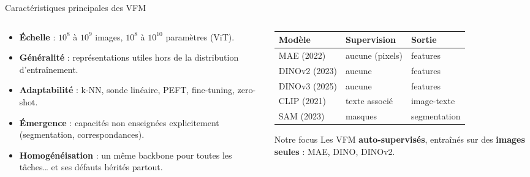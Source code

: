 \documentclass[aspectratio=169,10pt]{beamer}
\begin{document}
\begin{frame}{Caractéristiques principales des VFM}
  \begin{columns}[T]
    \begin{column}{0.5\textwidth}
      \begin{itemize}
        \setlength{\itemsep}{1.5mm}
        \item \textbf{Échelle} : $10^8$ à $10^9$ images, $10^8$ à $10^{10}$ paramètres (ViT).
        \item \textbf{Généralité} : représentations utiles hors de la distribution d'entraînement.
        \item \textbf{Adaptabilité} : k-NN, sonde linéaire, PEFT, fine-tuning, zero-shot.
        \item \textbf{Émergence} : capacités non enseignées explicitement (segmentation, correspondances).
        \item \textbf{Homogénéisation} : un même backbone pour toutes les tâches\ldots{} et ses défauts hérités partout.
      \end{itemize}
    \end{column}
    \begin{column}{0.47\textwidth}
      \small
      \begin{tabular}{@{}l l l@{}}
        \toprule
        \textbf{Modèle} & \textbf{Supervision} & \textbf{Sortie}\\
        \midrule
        MAE (2022) & aucune (pixels) & features\\
        DINOv2 (2023) & aucune & features\\
        DINOv3 (2025) & aucune & features\\
        CLIP (2021) & texte associé & image-texte\\
        SAM (2023) & masques & segmentation\\
        \bottomrule
      \end{tabular}
      \vspace{3mm}
      \begin{exampleblock}{Notre focus}
        \footnotesize Les VFM \textbf{auto-supervisés}, entraînés sur des \textbf{images seules} : MAE, DINO, DINOv2.
      \end{exampleblock}
    \end{column}
  \end{columns}
\end{frame}
\end{document}
